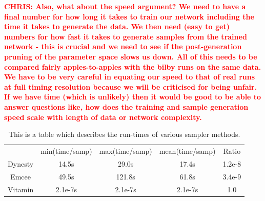 \documentclass[%
showpacs,
 amsmath,amssymb,
 aps,
 twocolumn,
 prl,
 reprint,
floatfix,
]{revtex4-1}
\newcommand{\chris}[1]{\textbf{\textcolor{red}{CHRIS: #1}}}
\begin{document}

\chris{Also, what about the speed argument? We need to have a final number for
how long it takes to train our network including the time it takes to generate
the data. We then need (easy to get) numbers for how fast it takes to generate
samples from the trained network - this is crucial and we need to see if the
post-generation pruning of the parameter space slows us down. All of this needs
to be compared fairly apples-to-apples with the bilby runs on the same data. We
have to be very careful in equating our speed to that of real runs at full
timing resolution because we will be criticised for being unfair. If we have
time (which is unlikely) then it would be good to be able to answer questions
like, how does the training and sample generation speed scale with length of
data or network complexity.}

%
% 
\begin{table}
 \begin{center}
   \caption{This is a table which describes the run-times of 
   various sampler methods.}
   \begin{tabular}{ |c|c|c|c|c| }
   \hline
    & min(time/samp) & max(time/samp) & mean(time/samp) & Ratio \\ 
   Dynesty & 14.5s & 29.0s & 17.4s & 1.2e-8\\ 
   Emcee & 49.5s & 121.8s & 61.8s & 3.4e-9\\
   Vitamin & 2.1e-7s & 2.1e-7s & 2.1e-7s & 1.0 \\ 
   \hline
  \end{tabular}
 \end{center}
\end{table}
\end{document}
